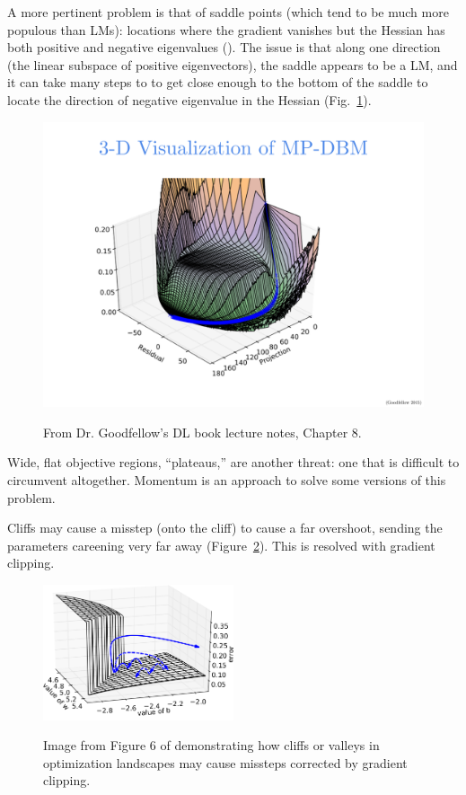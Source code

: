 \documentclass{article}
\begin{document}
A more pertinent problem is that of saddle points (which tend to be much more populous than LMs): locations where the gradient vanishes but the Hessian has both positive and negative eigenvalues (). The issue is that along one direction (the linear subspace of positive eigenvectors), the saddle appears to be a LM, and it can take many steps to to get close enough to the bottom of the saddle to locate the direction of negative eigenvalue in the Hessian (Fig.~\ref{fig:saddle}).
\begin{figure}[!h]
\centering
{\includegraphics[width=\textwidth]{saddle-bad.pdf}}
\caption{From Dr. Goodfellow's DL book lecture notes, Chapter 8.}
\label{fig:saddle}
\end{figure}

Wide, flat objective regions, ``plateaus,'' are another threat: one that is difficult to circumvent altogether. Momentum is an approach to solve some versions of this problem.

Cliffs may cause a misstep (onto the cliff) to cause a far overshoot, sending the parameters careening very far away (Figure~\ref{fig:pascanu}). This is resolved with gradient clipping.

\begin{figure}[!h]
\centering
{\includegraphics[width=0.5\textwidth]{pascanu2013.png}}
  \caption{Image from Figure 6 of  demonstrating how cliffs or valleys in optimization landscapes may cause missteps corrected by gradient clipping.}
\label{fig:pascanu}
\end{figure}
\end{document}
